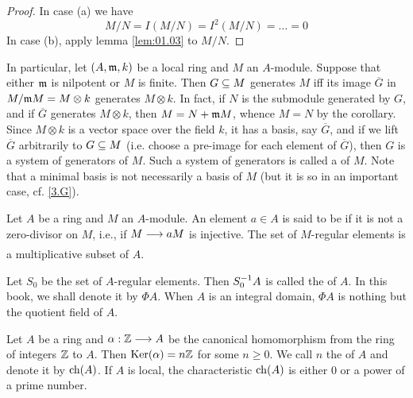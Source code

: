 \documentclass[../main]{subfiles}
\begin{document}
\begin{proof}
In case (a) we have
\[M/N = I(M/N) = I^2(M/N) = \ldots = 0\]
In case (b), apply lemma \ref{lem:01.03} to $M/N$.
\end{proof}

\newparagraph
In particular, let $(A,\mathfrak{m},k)$ be a local ring and $M$ an $A$-module. Suppose that either $\mathfrak{m}$ is nilpotent or $M$ is finite. Then $G\subseteq M$ generates $M$ iff its image $\overline G$ in $M/\mathfrak{m}M=M\otimes k$ generates $M\otimes k$. In fact, if $N$ is the submodule generated by $G$, and if $\overline G$ generates $M\otimes k$, then $M=N+\mathfrak{m}M$, whence $M=N$ by the corollary. Since $M\otimes k$ is a vector space over the field $k$, it has a basis, say $\overline G$, and if we lift $\overline G$ arbitrarily to $G\subseteq M$ (i.e. choose a pre-image for each element of $\overline G$), then $G$ is a system of generators of $M$. Such a system of generators is called a  of $M$. Note that a minimal basis is not necessarily a basis of $M$ (but it is so in an important case, cf. \ref{3.G}).

\newparagraph
Let $A$ be a ring and $M$ an $A$-module. An element $a\in A$ is said to be  if it is not a zero-divisor on $M$, i.e., if $M\varrightarrow{} aM$ is injective. The set of $M$-regular elements is a multiplicative subset of $A$.

Let $S_0$ be the set of $A$-regular elements. Then $S_0^{-1} A$ is called the  of $A$. In this book, we shall denote it by $\Phi A$. When $A$ is an integral domain, $\Phi A$ is nothing but the quotient field of $A$.

\newparagraph
Let $A$ be a ring and $\alpha:\mathbb{Z}\longrightarrow A$ be the canonical homomorphism from the ring of integers $\mathbb{Z}$ to $A$. Then $\operatorname{Ker}(\alpha)=n\mathbb{Z}$ for some $n\ge0$. We call $n$ the  of $A$ and denote it by $\operatorname{ch}(A)$. If $A$ is local, the characteristic $\operatorname{ch}(A)$ is either 0 or a power of a prime number.
\end{document}
